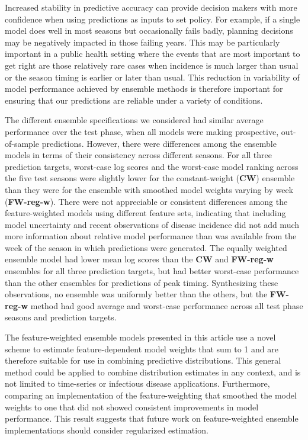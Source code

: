 \documentclass[10pt,letterpaper]{article}
\begin{document}
Increased stability in predictive accuracy can provide decision makers
with more confidence when using predictions as inputs to set policy. For
example, if a single model does well in most seasons but occasionally
fails badly, planning decisions may be negatively impacted in those
failing years. This may be particularly important in a public health
setting where the events that are most important to get right are those
relatively rare cases when incidence is much larger than usual or the
season timing is earlier or later than usual. This reduction in
variability of model performance achieved by ensemble methods is
therefore important for ensuring that our predictions are reliable under
a variety of conditions.

The different ensemble specifications we considered had similar average
performance over the test phase, when all models were making
prospective, out-of-sample predictions. However, there were differences
among the ensemble models in terms of their consistency across different
seasons. For all three prediction targets, worst-case log scores and the
worst-case model ranking across the five test seasons were slightly
lower for the constant-weight (\textbf{CW}) ensemble than they were for
the ensemble with smoothed model weights varying by week
(\textbf{FW-reg-w}). There were not appreciable or consistent
differences among the feature-weighted models using different feature
sets, indicating that including model uncertainty and recent
observations of disease incidence did not add much more information
about relative model performance than was available from the week of the
season in which predictions were generated. The equally weighted
ensemble model had lower mean log scores than the \textbf{CW} and
\textbf{FW-reg-w} ensembles for all three prediction targets, but had
better worst-case performance than the other ensembles for predictions
of peak timing. Synthesizing these observations, no ensemble was
uniformly better than the others, but the \textbf{FW-reg-w} method had
good average and worst-case performance across all test phase seasons
and prediction targets.

The feature-weighted ensemble models presented in this article use a
novel scheme to estimate feature-dependent model weights that sum to 1
and are therefore suitable for use in combining predictive
distributions. This general method could be applied to combine
distribution estimates in any context, and is not limited to time-series
or infectious disease applications. Furthermore, comparing an
implementation of the feature-weighting that smoothed the model weights
to one that did not showed consistent improvements in model performance.
This result suggests that future work on feature-weighted ensemble
implementations should consider regularized estimation.
\end{document}
